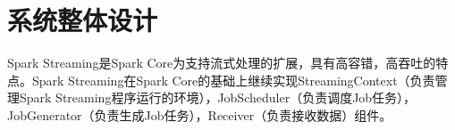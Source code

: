 






\section{系统整体设计}
Spark Streaming是Spark Core为支持流式处理的扩展，具有高容错，高吞吐的特点。Spark Streaming在Spark Core的基础上继续实现StreamingContext（负责管理Spark Streaming程序运行的环境），JobScheduler（负责调度Job任务），JobGenerator（负责生成Job任务），Receiver（负责接收数据）组件。

